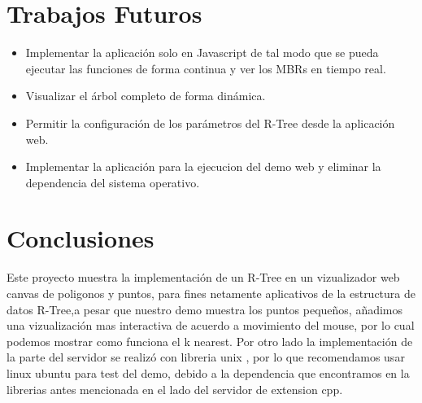 \documentclass[12pt]{article}
\begin{document}
\section*{Trabajos Futuros} %
\begin{itemize}
\item Implementar la aplicación solo en Javascript de tal modo que se pueda ejecutar las funciones de forma continua y ver los MBRs en tiempo real.
\item Visualizar el árbol completo de forma dinámica.
\item Permitir la configuración de los parámetros del R-Tree desde la aplicación web.
\item Implementar la aplicación para la ejecucion del demo web y eliminar la dependencia del sistema operativo.
\end{itemize}

\section*{Conclusiones} %
Este proyecto muestra la implementación de un R-Tree en un vizualizador web canvas de poligonos y puntos, para fines netamente aplicativos de la estructura de datos R-Tree,a pesar que nuestro demo muestra los puntos pequeños, añadimos una vizualización mas interactiva de acuerdo a movimiento del mouse, por lo cual podemos mostrar como funciona el k nearest. Por otro lado la implementación de la parte del servidor se realizó con libreria unix , por lo que recomendamos usar linux ubuntu para test del demo, debido a la dependencia que encontramos en la librerias antes mencionada en el lado del servidor de extension cpp. 
\end{document}

